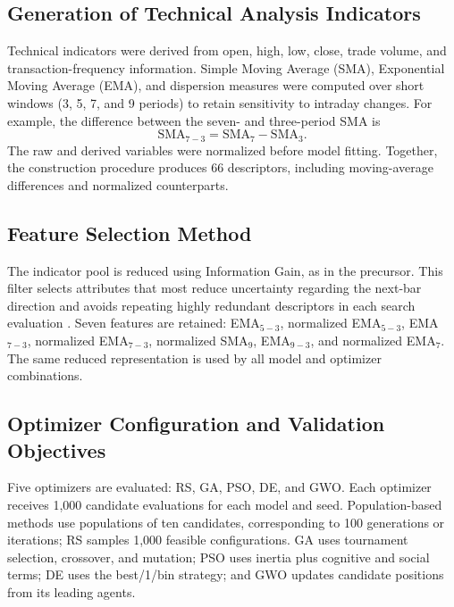\subsection{Generation of Technical Analysis Indicators}
\label{sec:indicators}

Technical indicators were derived from open, high, low, close, trade volume, and transaction-frequency information. Simple Moving Average (SMA), Exponential Moving Average (EMA), and dispersion measures were computed over short windows (3, 5, 7, and 9 periods) to retain sensitivity to intraday changes. For example, the difference between the seven- and three-period SMA is
\begin{equation}
\mathrm{SMA}_{7-3}=\mathrm{SMA}_{7}-\mathrm{SMA}_{3}.
\end{equation}
The raw and derived variables were normalized before model fitting. Together, the construction procedure produces 66 descriptors, including moving-average differences and normalized counterparts.

\subsection{Feature Selection Method}
\label{sec:featureselection}

The indicator pool is reduced using Information Gain, as in the precursor. This filter selects attributes that most reduce uncertainty regarding the next-bar direction and avoids repeating highly redundant descriptors in each search evaluation \cite{lei2012feature,kumar2014feature}. Seven features are retained: EMA$_{5-3}$, normalized EMA$_{5-3}$, EMA$_{7-3}$, normalized EMA$_{7-3}$, normalized SMA$_9$, EMA$_{9-3}$, and normalized EMA$_7$. The same reduced representation is used by all model and optimizer combinations.

\subsection{Optimizer Configuration and Validation Objectives}
\label{sec:optimizerconfiguration}

Five optimizers are evaluated: RS, GA, PSO, DE, and GWO. Each optimizer receives 1,000 candidate evaluations for each model and seed. Population-based methods use populations of ten candidates, corresponding to 100 generations or iterations; RS samples 1,000 feasible configurations. GA uses tournament selection, crossover, and mutation; PSO uses inertia plus cognitive and social terms; DE uses the best/1/bin strategy; and GWO updates candidate positions from its leading agents.


